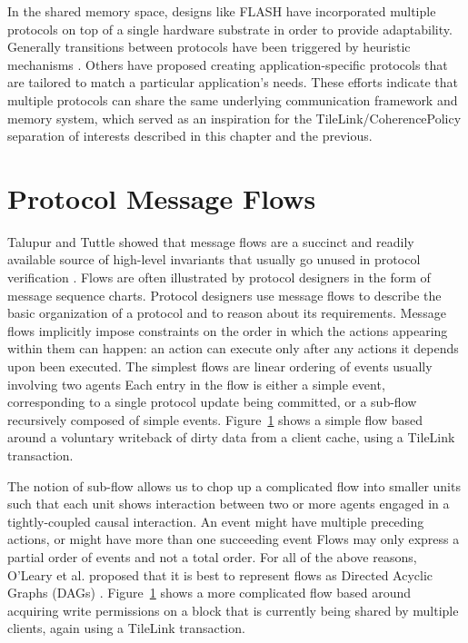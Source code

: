 In the shared memory space, designs like FLASH \cite{kuskin-archnews94} have incorporated multiple protocols on top of a single hardware substrate in order to provide adaptability. Generally transitions between protocols have been triggered by heuristic mechanisms \cite{mukherjee-archnews98}. Others \cite{chandra-sigplan96,falsafi-sc94} have proposed creating application-specific protocols that are tailored to match a particular application's needs.
These efforts indicate that multiple protocols can share the same underlying communication framework and memory system,
which served as an inspiration for the TileLink/CoherencePolicy separation of interests described in this chapter and the previous.

\section{Protocol Message Flows}

Talupur and Tuttle showed that message flows are a succinct and
readily available source of high-level invariants that usually go
unused in protocol verification \cite{talupur2008going}.
Flows are often illustrated by protocol designers in the form of message sequence charts.
Protocol designers use message flows to describe
the basic organization of a protocol and to reason about its requirements.
Message flows implicitly impose constraints
on the order in which the actions appearing within them can happen:
an action can execute only after any actions it depends upon been executed.
The simplest flows are linear ordering of events usually involving two agents
Each entry in the flow is either a simple event, 
corresponding to a single protocol update being committed,
or a sub-flow recursively composed of simple events.
Figure~\ref{} shows a simple flow based around a voluntary writeback of dirty data from a client cache,
using a TileLink transaction.

The notion of sub-flow allows us to
chop up a complicated flow into smaller units such that each
unit shows interaction between two or more agents engaged in a tightly-coupled causal interaction.
An event might have multiple preceding actions,
or might have more than one succeeding event
Flows may only express a partial order of events and not a total order.
For all of the above reasons, O'Leary et al. proposed that it is best to represent flows as Directed Acyclic Graphs (DAGs)
\cite{oleary-fmcad09}.
Figure~\ref{} shows a more complicated flow based around acquiring write permissions on a block that is currently being
shared by multiple clients, again using a TileLink transaction.

